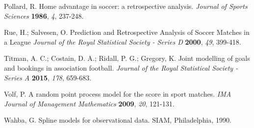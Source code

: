 \documentclass[journal,article,accept,moreauthors,pdftex,12pt,a4paper]{mdpi}
\begin{document}
\begin{thebibliography}{999}
Pollard, R. Home advantage in soccer: a retrospective analysis. {\em Journal of Sports Sciences} {\bf 1986}, {\em 4}, 237-248.

Rue, H.; Salvesen, O. Prediction and Retrospective Analysis of
Soccer Matches in a League {\em Journal of the Royal Statistical
Society - Series D} {\bf 2000}, {\em 49}, 399-418.

Titman, A. C.; Costain, D. A.; Ridall, P. G.; Gregory, K. Joint
modelling of goals and bookings in association football. {\em
Journal of the Royal Statistical Society - Series A} {\bf 2015},
{\em 178}, 659-683.

Volf, P. A random point process model for the score in sport
matches. {\em IMA Journal of Management Mathematics} {\bf 2009},
{\em 20}, 121-131.

Wahba, G. Spline models for observational data. SIAM, Philadelphia,
1990.

\end{thebibliography}

%
%


%


%
\end{document}
